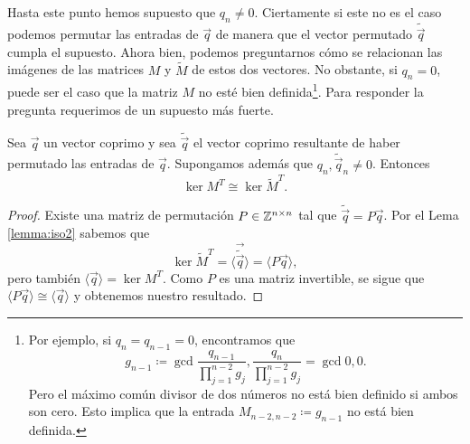 Hasta este punto hemos supuesto que $q_n \neq 0$. Ciertamente si este no es el caso podemos
permutar las entradas de $\vec{q}$ de manera que el vector permutado $\tilde{\vec{q}}$ cumpla el
supuesto. Ahora bien, podemos preguntarnos cómo se relacionan las imágenes de las matrices $M$ y
$\tilde{M}$ de estos dos vectores. No obstante, si $q_n = 0$, puede ser el caso que la matriz
$M$ no esté bien definida\footnote{
	Por ejemplo, si $q_n = q_{n-1} = 0$, encontramos que
	\begin{equation*}
		g_{n-1} \coloneq \gcd{\frac{q_{n-1}}{\prod_{j=1}^{n-2}g_j},
		\frac{q_n}{\prod_{j=1}^{n-2}g_j}} = \gcd{0, 0}.
	\end{equation*}
	Pero el máximo común divisor de dos números no está bien definido si ambos son cero. Esto
	implica que la entrada $M_{n-2, n-2} \coloneq g_{n-1}$ no está bien definida.
}. Para responder la pregunta requerimos de un supuesto más fuerte.
\begin{corollary}
	\label{cor:iso3}
	Sea $\vec{q}$ un vector coprimo y sea $\tilde{\vec{q}}$ el vector coprimo resultante de haber
	permutado las entradas de $\vec{q}$. Supongamos además que $q_n, \tilde{\vec{q}}_n \neq 0$.
	Entonces
	\begin{equation*}
		\ker{M^T} \cong \ker{\tilde{M}^T}.
	\end{equation*}
\end{corollary}
\begin{proof}
	Existe una matriz de permutación $P \in \mathbb{Z}^{n \times n}$ tal que $\tilde{\vec{q}} = P\vec{q}$.
	Por el Lema \ref{lemma:iso2} sabemos que
	\begin{equation*}
		\ker{\tilde{M}^T} = \langle \vec{\tilde{\vec{q}}} \rangle = \langle P\vec{q} \rangle,
	\end{equation*}
	pero también $\langle \vec{q} \rangle = \ker{M^T}$. Como $P$ es una matriz invertible, se sigue
	que $\langle P\vec{q} \rangle \cong \langle \vec{q} \rangle$ y obtenemos nuestro resultado.
\end{proof}
